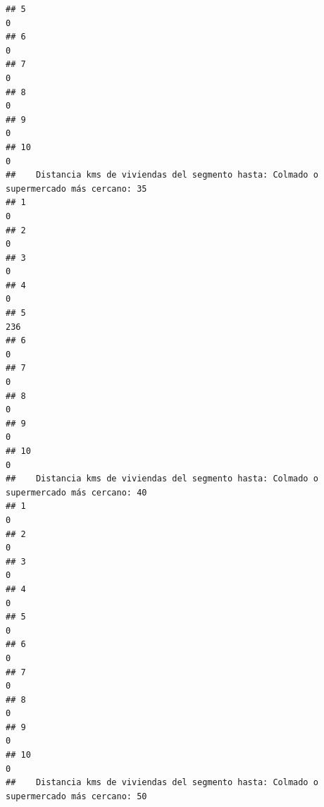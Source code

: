 \documentclass[11pt,]{article}
\begin{document}
\begin{verbatim}
## 5                                                                                      0
## 6                                                                                      0
## 7                                                                                      0
## 8                                                                                      0
## 9                                                                                      0
## 10                                                                                     0
##    Distancia kms de viviendas del segmento hasta: Colmado o supermercado más cercano: 35
## 1                                                                                      0
## 2                                                                                      0
## 3                                                                                      0
## 4                                                                                      0
## 5                                                                                    236
## 6                                                                                      0
## 7                                                                                      0
## 8                                                                                      0
## 9                                                                                      0
## 10                                                                                     0
##    Distancia kms de viviendas del segmento hasta: Colmado o supermercado más cercano: 40
## 1                                                                                      0
## 2                                                                                      0
## 3                                                                                      0
## 4                                                                                      0
## 5                                                                                      0
## 6                                                                                      0
## 7                                                                                      0
## 8                                                                                      0
## 9                                                                                      0
## 10                                                                                     0
##    Distancia kms de viviendas del segmento hasta: Colmado o supermercado más cercano: 50

\end{verbatim}
\end{document}
